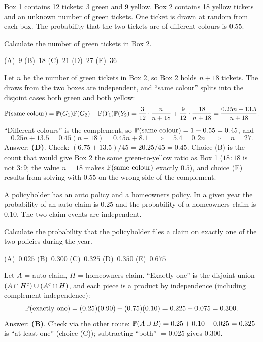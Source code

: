 \begin{example}
Box 1 contains 12 tickets: 3 green and 9 yellow. Box 2 contains 18 yellow tickets and an unknown number of green tickets. One ticket is drawn at random from each box. The probability that the two tickets are of different colours is $0.55$.

Calculate the number of green tickets in Box 2.

\begin{center}
(A)~$9$ \quad (B)~$18$ \quad (C)~$21$ \quad (D)~$27$ \quad (E)~$36$
\end{center}
\end{example}
\begin{solution}
Let $n$ be the number of green tickets in Box 2, so Box 2 holds $n + 18$ tickets. The draws from the two boxes are independent, and ``same colour'' splits into the disjoint cases both green and both yellow:
\[
\mathbb{P}(\text{same colour}) = \mathbb{P}(G_1)\mathbb{P}(G_2) + \mathbb{P}(Y_1)\mathbb{P}(Y_2) = \frac{3}{12}\cdot\frac{n}{n+18} + \frac{9}{12}\cdot\frac{18}{n+18} = \frac{0.25n + 13.5}{n + 18}.
\]
``Different colours'' is the complement, so $\mathbb{P}(\text{same colour}) = 1 - 0.55 = 0.45$, and
\[
0.25n + 13.5 = 0.45(n + 18) = 0.45n + 8.1 \quad\Longrightarrow\quad 5.4 = 0.2n \quad\Longrightarrow\quad n = 27.
\]
Answer: \textbf{(D)}. Check: $(6.75 + 13.5)/45 = 20.25/45 = 0.45$. Choice (B) is the count that would give Box 2 the same green-to-yellow ratio as Box 1 ($18 : 18$ is not $3 : 9$; the value $n = 18$ makes $\mathbb{P}(\text{same colour})$ exactly $0.5$), and choice (E) results from solving with $0.55$ on the wrong side of the complement.
\end{solution}

\begin{example}
A policyholder has an auto policy and a homeowners policy. In a given year the probability of an auto claim is $0.25$ and the probability of a homeowners claim is $0.10$. The two claim events are independent.

Calculate the probability that the policyholder files a claim on exactly one of the two policies during the year.

\begin{center}
(A)~$0.025$ \quad (B)~$0.300$ \quad (C)~$0.325$ \quad (D)~$0.350$ \quad (E)~$0.675$
\end{center}
\end{example}
\begin{solution}
Let $A$ = auto claim, $H$ = homeowners claim. ``Exactly one'' is the disjoint union $(A \cap H^{\mathrm{c}}) \cup (A^{\mathrm{c}} \cap H)$, and each piece is a product by independence (including complement independence):
\[
\mathbb{P}(\text{exactly one}) = (0.25)(0.90) + (0.75)(0.10) = 0.225 + 0.075 = 0.300.
\]
Answer: \textbf{(B)}. Check via the other route: $\mathbb{P}(A \cup B) = 0.25 + 0.10 - 0.025 = 0.325$ is ``at least one'' (choice (C)); subtracting ``both'' $= 0.025$ gives $0.300$.
\end{solution}

